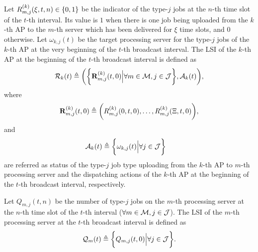 \begin{definition}
    Let $R^{(k)}_{m,j}(\xi,t,n) \in \{0,1\}$ be the indicator of the type-$j$ jobs at the $n$-th time slot of the $t$-th interval.
    Its value is $1$ when there is one job being uploaded from the $k$-th AP to the $m$-th server which has been delivered for $\xi$ time slots, and $0$ otherwise.
    Let $\omega_{k,j}(t)$ be the target processing server for the type-$j$ jobs of the $k$-th AP at the very beginning of the $t$-th broadcast interval.
    The LSI of the $k$-th AP at the beginning of the $t$-th broadcast interval is defined as
    {\small
    \begin{align}
        \mathcal{R}_{k}(t) \triangleq
        \bigg(
            \bigg\{\mathbf{R}^{(k)}_{m,j}(t,0) \Big| \forall m\in\mathcal{M},j\in\mathcal{J}\bigg\},
            \mathcal{A}_{k}(t)
        \bigg),
    \end{align}
    }%
    where
    {\small
    \begin{align}
        \mathbf{R}^{(k)}_{m,j}(t,0) \triangleq \bigg(
            R^{(k)}_{m,j}(0,t,0), \dots, R^{(k)}_{m,j}(\Xi,t,0)
        \bigg),
    \end{align}
    }%
    and
    {\small
    \begin{align}
        \mathcal{A}_{k}(t) &\triangleq \bigg\{\omega_{k,j}(t) \Big| \forall j\in\mathcal{J}\bigg\}
    \end{align}
    }%
    are referred as status of the type-$j$ job type uploading from the $k$-th AP to $m$-th processing server and the dispatching actions of the $k$-th AP at the beginning of the $t$-th broadcast interval, respectively.
\end{definition}

\begin{definition}
    Let $Q_{m,j}({t,n})$ be the number of type-$j$ jobs on the $m$-th processing server at the $n$-th time slot of the $t$-th interval ($\forall m\in\mathcal{M}, j\in\mathcal{J}$).
    The LSI of the $m$-th processing server at the $t$-th broadcast interval is defined as
    {\small
    \begin{align}
        \mathcal{Q}_{m}(t) \triangleq \bigg\{
            Q_{m,j}(t, 0) \Big| \forall j\in\mathcal{J}
        \bigg\}.
    \end{align}
    }%
\end{definition}

